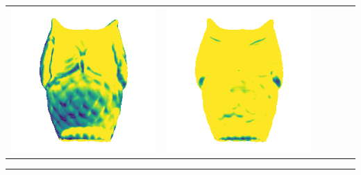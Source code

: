 \begin{tabularx}{\linewidth}{@{}Y@{}Y@{}Y@{}Y@{}Y@{}Y@{}}
\includegraphics[width=\linewidth]{semisynthetic/20160617_15_marrnet_err.png} &
\includegraphics[width=\linewidth]{semisynthetic/20160617_15_ef_err.png} \\
\end{tabularx}
\begin{center}\rule{0.5\linewidth}{\linethickness}\end{center}

